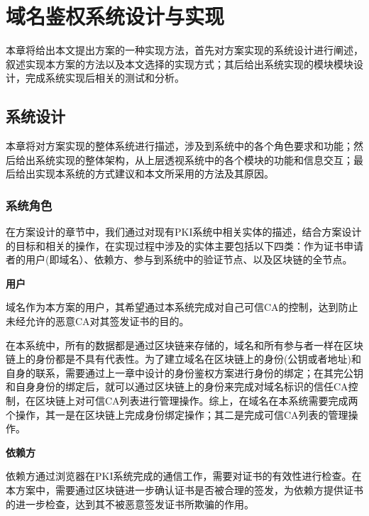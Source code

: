 
\chapter{域名鉴权系统设计与实现}

本章将给出本文提出方案的一种实现方法，首先对方案实现的系统设计进行阐述，叙述实现本方案的方法以及本文选择的实现方式；其后给出系统实现的模块模块设计，完成系统实现后相关的测试和分析。

\section{系统设计}

本章将对方案实现的整体系统进行描述，涉及到系统中的各个角色要求和功能；然后给出系统实现的整体架构，从上层透视系统中的各个模块的功能和信息交互；最后给出实现本系统的方式建议和本文所采用的方法及其原因。

\subsection{系统角色}


在方案设计的章节中，我们通过对现有PKI系统中相关实体的描述，结合方案设计的目标和相关的操作，在实现过程中涉及的实体主要包括以下四类：作为证书申请者的用户(即域名）、依赖方、参与到系统中的验证节点、以及区块链的全节点。


\noindent\textbf{用户}

域名作为本方案的用户，其希望通过本系统完成对自己可信CA的控制，达到防止未经允许的恶意CA对其签发证书的目的。

在本系统中，所有的数据都是通过区块链来存储的，域名和所有参与者一样在区块链上的身份都是不具有代表性。为了建立域名在区块链上的身份(公钥或者地址)和自身的联系，需要通过上一章中设计的身份鉴权方案进行身份的绑定；在其完公钥和自身身份的绑定后，就可以通过区块链上的身份来完成对域名标识的信任CA控制，在区块链上对可信CA列表进行管理操作。综上，在域名在本系统需要完成两个操作，其一是在区块链上完成身份绑定操作；其二是完成可信CA列表的管理操作。


\noindent\textbf{依赖方}

依赖方通过浏览器在PKI系统完成的通信工作，需要对证书的有效性进行检查。在本方案中，需要通过区块链进一步确认证书是否被合理的签发，为依赖方提供证书的进一步检查，达到其不被恶意签发证书所欺骗的作用。

